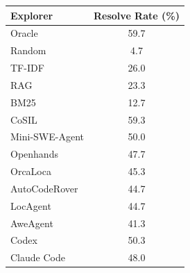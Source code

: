 \documentclass{llmxive}
\providecommand{\arraystretch}{1.18}
\begin{document}
\begin{table}[t]
  \centering
  \begin{minipage}[t]{0.46\linewidth}
    \vspace{0pt}
    \centering
    \label{tab:downstream}
    \vspace{1mm}
    \footnotesize
\renewcommand{\arraystretch}{1.15}
\begin{tabular}{@{} l c @{}}
  \toprule
  Explorer & Resolve Rate (\%) \\
  \midrule
  Oracle             & 59.7 \\
  Random             &  4.7 \\
  \midrule
  TF-IDF             & 26.0 \\
  RAG                & 23.3 \\
  BM25               & 12.7 \\
  \midrule
  CoSIL              & 59.3 \\
  Mini-SWE-Agent     & 50.0 \\
  Openhands          & 47.7 \\
  OrcaLoca           & 45.3 \\
  AutoCodeRover      & 44.7 \\
  LocAgent           & 44.7 \\
  AweAgent           & 41.3 \\
  \midrule
  Codex              & 50.3 \\
  Claude Code        & 48.0 \\
  \bottomrule
\end{tabular}


\end{minipage}
\end{table}
\end{document}

